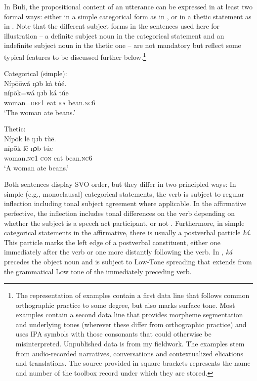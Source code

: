 \documentclass[output=paper]{langsci/langscibook}
\begin{document}
In Buli, the propositional content of an utterance can be expressed in at least two formal ways: either in a simple categorical form as in , or in a thetic statement as in . Note that the different subject forms in the sentences used here for illustration – a definite subject noun in the categorical statement and an indefinite subject noun in the thetic one – are not mandatory but reflect some typical features to be discussed further below.\footnote{The representation of examples contain a first data line that follows common orthographic practice to some degree, but also marks surface tone. Most examples contain a second data line that provides morpheme segmentation and underlying tones (wherever these differ from orthographic practice) and uses IPA symbols with those consonants that could otherwise be misinterpreted. Unpublished data is from my fieldwork. The examples stem from audio-recorded narratives, conversations and contextualized elications and translations. The source provided in square brackets represents the name and number of the toolbox record under which they are stored.} 
 
\ea\label{ex:schwarz:5}
 Categorical (simple):  \\
\glll Níp\={o}\={o}wá  ŋɔb  kà  túé.\\
    \textup{níp\={o}k=wá } \textup{ŋɔb}  \textup{ká} \textup{túe}\\
     woman=\textsc{def}1  eat  \textsc{ka}  bean.\textsc{nc}6\\
\glt ‘The woman ate beans.’
\z

\ea\label{ex:schwarz:6}
Thetic: \\
\glll Níp\={o}k    l\={e}  ŋɔb  tù\={e}.\\
     \textup{níp\={o}k}    l\={e}  \textup{ŋɔb}  \textup{túe}\\
     woman.\textsc{nc}1  \textsc{con}  eat  bean.\textsc{nc}6\\
\glt ‘A woman ate beans.’
\z

Both sentences display SVO order, but they differ in two principled ways: In simple (e.g., monoclausal) categorical statements, the verb is subject to regular inflection including tonal subject agreement where applicable. In the affirmative perfective, the inflection includes tonal differences on the verb depending on whether the subject is a speech act participant, or not \citep{Schwarz2007}. Furthermore, in simple categorical statements in the affirmative, there is usually a postverbal particle \textit{ká.} This particle marks the left edge of a postverbal constituent, either one immediately after the verb or one more distantly following the verb. In , \textit{ká} precedes the object noun and is subject to Low-Tone spreading that extends from the grammatical Low tone of the immediately preceding verb.
\end{document}
